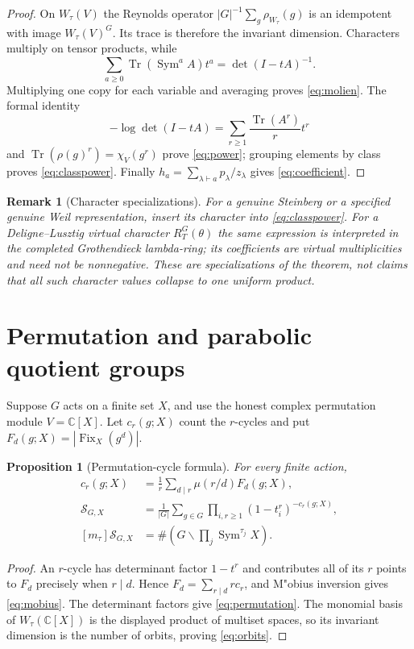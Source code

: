 \documentclass[11pt]{article}
\newtheorem{proposition}[theorem]{Proposition}
\newtheorem{remark}[theorem]{Remark}
\newcommand{\Sym}{\operatorname{Sym}}
\newcommand{\Tr}{\operatorname{Tr}}
\newcommand{\Fix}{\operatorname{Fix}}
\newcommand{\MGF}{\mathcal S}
\newcommand{\C}{\mathbb C}
\begin{document}
\begin{proof}
On $W_\tau(V)$ the Reynolds operator
$|G|^{-1}\sum_g\rho_{W_\tau}(g)$ is an idempotent with image
$W_\tau(V)^G$.  Its trace is therefore the invariant dimension.  Characters
multiply on tensor products, while
\[
 \sum_{a\ge0}\Tr(\Sym^aA)t^a=\det(I-tA)^{-1}.
\]
Multiplying one copy for each variable and averaging proves
\eqref{eq:molien}.  The formal identity
\[
 -\log\det(I-tA)=\sum_{r\ge1}\frac{\Tr(A^r)}r t^r
\]
and $\Tr(\rho(g)^r)=\chi_V(g^r)$ prove \eqref{eq:power}; grouping elements by
class proves \eqref{eq:classpower}.  Finally
$h_a=\sum_{\lambda\vdash a}p_\lambda/z_\lambda$ gives
\eqref{eq:coefficient}.
\end{proof}

\begin{remark}[Character specializations]
For a genuine Steinberg or a specified genuine Weil representation, insert
its character into \eqref{eq:classpower}.  For a Deligne--Lusztig virtual
character $R_T^G(\theta)$ the same expression is interpreted in the completed
Grothendieck lambda-ring; its coefficients are virtual multiplicities and
need not be nonnegative.  These are specializations of the theorem, not
claims that all such character values collapse to one uniform product.
\end{remark}

\section{Permutation and parabolic quotient groups}

Suppose $G$ acts on a finite set $X$, and use the honest complex permutation
module $V=\C[X]$.  Let $c_r(g;X)$ count the $r$-cycles and put
$F_d(g;X)=|\Fix_X(g^d)|$.

\begin{proposition}[Permutation-cycle formula]\label{prop:permutation}
For every finite action,
\begin{align}
c_r(g;X)&=\frac1r\sum_{d\mid r}\mu(r/d)F_d(g;X),\label{eq:mobius}\\
\MGF_{G,X}&=\frac1{|G|}\sum_{g\in G}\prod_{i,r\ge1}
 (1-t_i^r)^{-c_r(g;X)},\label{eq:permutation}\\
[m_\tau]\MGF_{G,X}&=\#\left(G\backslash
 \prod_j\Sym^{\tau_j}X\right).\label{eq:orbits}
\end{align}
\end{proposition}

\begin{proof}
An $r$-cycle has determinant factor $1-t^r$ and contributes all of its $r$
points to $F_d$ precisely when $r\mid d$.  Hence
$F_d=\sum_{r\mid d}r c_r$, and M"obius inversion gives
\eqref{eq:mobius}.  The determinant factors give \eqref{eq:permutation}.
The monomial basis of $W_\tau(\C[X])$ is the displayed product of multiset
spaces, so its invariant dimension is the number of orbits, proving
\eqref{eq:orbits}.
\end{proof}
\end{document}
